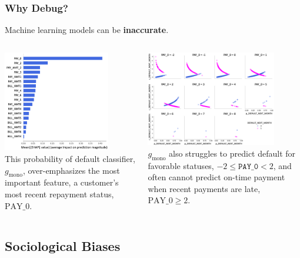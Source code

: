 \documentclass[11pt,
               aspectratio=43,
               hyperref={colorlinks}
               ]{beamer}
\begin{document}
			\begin{frame}
		
				\frametitle{Why Debug?}
		
					\footnotesize{Machine learning models can be \textbf{inaccurate}.}
					\begin{columns}
				
						\centering
						\includegraphics[height=125pt]{img/global_shap.png}\\
						\vspace{5pt}
						\tiny{This probability of default classifier, $g_{\text{mono}}$, over-emphasizes the most important feature, a customer's most recent repayment status, $\text{PAY\_0}$.}

						\vspace{10pt}
						\centering
						\includegraphics[height=118pt]{img/resid.png}\\
						\vspace{5pt}
						\tiny{$g_{\text{mono}}$ also struggles to predict default for favorable statuses, $-2  \leq \texttt{PAY\_0}  < 2$, and often cannot predict on-time payment when recent payments are late, $\text{PAY\_0} \geq 2$}.
				
					\end{columns}
					\normalsize
			
			\end{frame}
	
		\subsection{Sociological Biases}
	
\end{document}
